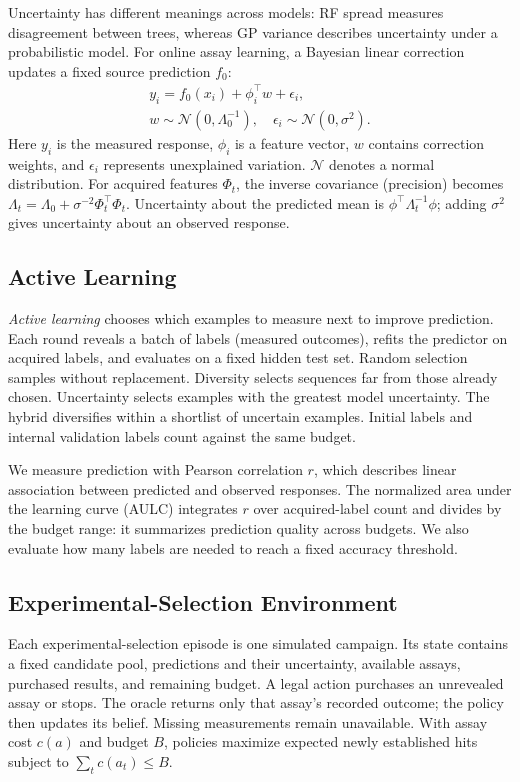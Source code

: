 \documentclass[letterpaper]{article}
\begin{document}
Uncertainty has different meanings across models: RF spread measures disagreement between trees, whereas GP variance describes uncertainty under a probabilistic model. For online assay learning, a Bayesian linear correction updates a fixed source prediction $f_0$:
\begin{equation}
 \begin{gathered}
 y_i=f_0(x_i)+\phi_i^\top w+\epsilon_i,\\
 w\sim\mathcal N(0,\Lambda_0^{-1}),\quad
 \epsilon_i\sim\mathcal N(0,\sigma^2).
 \end{gathered}
 \label{eq:belief}
\end{equation}
Here $y_i$ is the measured response, $\phi_i$ is a feature vector, $w$ contains correction weights, and $\epsilon_i$ represents unexplained variation. $\mathcal N$ denotes a normal distribution. For acquired features $\Phi_t$, the inverse covariance (precision) becomes $\Lambda_t=\Lambda_0+\sigma^{-2}\Phi_t^\top\Phi_t$. Uncertainty about the predicted mean is $\phi^\top\Lambda_t^{-1}\phi$; adding $\sigma^2$ gives uncertainty about an observed response. 

\subsection{Active Learning}
\emph{Active learning} chooses which examples to measure next to improve prediction. Each round reveals a batch of labels (measured outcomes), refits the predictor on acquired labels, and evaluates on a fixed hidden test set. Random selection samples without replacement. Diversity selects sequences far from those already chosen. Uncertainty selects examples with the greatest model uncertainty. The hybrid diversifies within a shortlist of uncertain examples. Initial labels and internal validation labels count against the same budget.

We measure prediction with Pearson correlation $r$, which describes linear association between predicted and observed responses. The normalized area under the learning curve (AULC) integrates $r$ over acquired-label count and divides by the budget range: it summarizes prediction quality across budgets. We also evaluate how many labels are needed to reach a fixed accuracy threshold.

\subsection{Experimental-Selection Environment}
Each experimental-selection episode is one simulated campaign. Its state contains a fixed candidate pool, predictions and their uncertainty, available assays, purchased results, and remaining budget. A legal action purchases an unrevealed assay or stops. The oracle returns only that assay's recorded outcome; the policy then updates its belief. Missing measurements remain unavailable. With assay cost $c(a)$ and budget $B$, policies maximize expected newly established hits subject to $\sum_t c(a_t)\leq B$.
\end{document}
